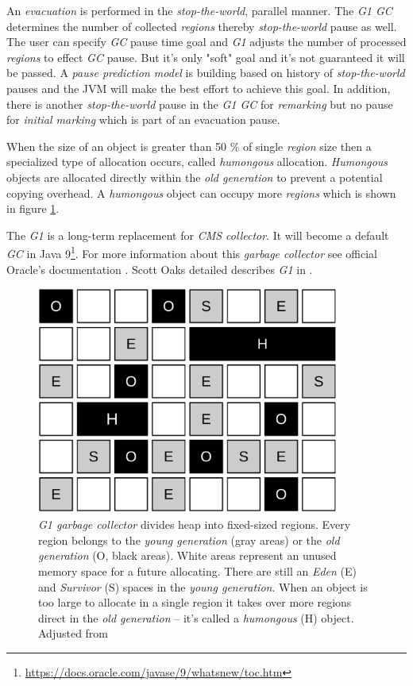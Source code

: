 \documentclass[
  digital, %
  oneside,
  notable, %
  nolof,     %
  nolot     %
]{fithesis3}
\begin{document}
An \textit{evacuation} is performed in the \textit{stop-the-world}, parallel manner. The \textit{G1 GC} determines the number of collected \textit{regions} thereby \textit{stop-the-world} pause as well. The user can specify \textit{GC} pause time goal and \textit{G1} adjusts the number of processed \textit{regions} to effect \textit{GC} pause. But it's only "soft" goal and it's not guaranteed it will be passed. A \textit{pause prediction model} is building based on history of \textit{stop-the-world} pauses and the JVM will make the best effort to achieve this goal. In addition, there is another \textit{stop-the-world} pause in the \textit{G1 GC} for \textit{remarking} but no pause for \textit{initial marking} which is part of an evacuation pause. \cite{gctuning}

When the size of an object is greater than 50 \% of single \textit{region} size then a specialized type of allocation occurs, called \textit{humongous} allocation. \textit{Humongous} objects are allocated directly within the \textit{old generation} to prevent a potential copying overhead. A \textit{humongous} object can occupy more \textit{regions} which is shown in figure \ref{g1}. \cite{redhat}

The \textit{G1} is a long-term replacement for \textit{CMS collector}. It will become a default \textit{GC} in Java 9\footnote{\url{https://docs.oracle.com/javase/9/whatsnew/toc.htm}}. For more information about this \textit{garbage collector} see official Oracle's documentation \cite{gctuning}. Scott Oaks detailed describes \textit{G1} in \cite{scott}.

\begin{figure}[h]
	\centering
	\includegraphics[width=10cm]{fig/g1.pdf}
	\caption{\textit{G1 garbage collector} divides heap into fixed-sized regions. Every region belongs to the \textit{young generation} (gray areas) or the \textit{old generation} (O, black areas). White areas represent an unused memory space for a future allocating. There are still an \textit{Eden} (E) and \textit{Survivor} (S) spaces  in the \textit{young generation}. When an object is too large to allocate in a single region it takes over more regions direct in the \textit{old generation} -- it's called a \textit{humongous} (H) object. Adjusted from \cite{redhat}~\cite{gctuning}}
	\label{g1}
\end{figure}
\end{document}
